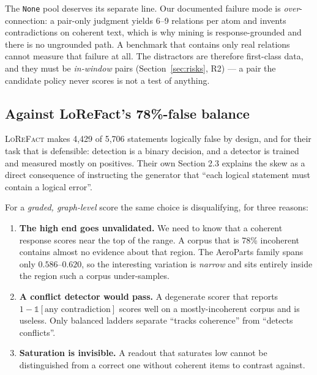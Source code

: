\documentclass[11pt]{article}
\begin{document}
The \texttt{None} pool deserves its separate line. Our documented failure mode is
\emph{over}-connection: a pair-only judgment yields 6--9 relations per atom and invents
contradictions on coherent text, which is why mining is response-grounded and there is no
ungrounded path. A benchmark that contains only real relations cannot measure that failure at
all. The distractors are therefore first-class data, and they must be \emph{in-window} pairs
(Section~\ref{sec:risks}, R2) --- a pair the candidate policy never scores is not a test of
anything.

\subsection{Against LoReFact's 78\%-false balance}
\label{sec:balance}

\textsc{LoReFact} makes 4{,}429 of 5{,}706 statements logically false by design, and for their
task that is defensible: detection is a binary decision, and a detector is trained and
measured mostly on positives. Their own Section 2.3 explains the skew as a direct consequence
of instructing the generator that ``each logical statement must contain a logical error''.

For a \emph{graded, graph-level} score the same choice is disqualifying, for three reasons:

\begin{enumerate}[leftmargin=*,nosep,label=(\arabic*)]
  \item \textbf{The high end goes unvalidated.} We need to know that a coherent response
        scores near the top of the range. A corpus that is 78\% incoherent contains almost no
        evidence about that region. The AeroParts family spans only $0.586$--$0.620$, so the
        interesting variation is \emph{narrow} and sits entirely inside the region such a
        corpus under-samples.
  \item \textbf{A conflict detector would pass.} A degenerate scorer that reports
        $1-\mathbb{1}[\text{any contradiction}]$ scores well on a mostly-incoherent corpus and
        is useless. Only balanced ladders separate ``tracks coherence'' from ``detects
        conflicts''.
  \item \textbf{Saturation is invisible.} A readout that saturates low cannot be distinguished
        from a correct one without coherent items to contrast against.
\end{enumerate}
\end{document}
